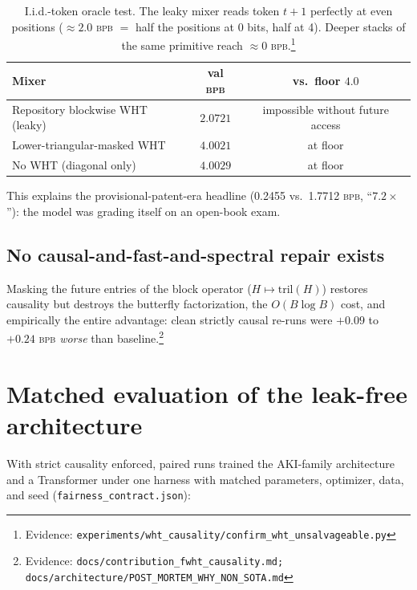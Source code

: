 \documentclass[11pt]{article}
\newcommand{\bpb}{\textsc{bpb}}
\newcommand{\evid}[1]{\footnote{Evidence: \texttt{#1}}}
\begin{document}
\begin{table}[h]
\centering
\begin{tabular}{lcc}
\toprule
Mixer & val \bpb & vs.\ floor $4.0$\\
\midrule
Repository blockwise WHT (leaky) & $\mathbf{2.0721}$ & impossible without future access\\
Lower-triangular-masked WHT & $4.0021$ & at floor\\
No WHT (diagonal only) & $4.0029$ & at floor\\
\bottomrule
\end{tabular}
\caption{I.i.d.-token oracle test. The leaky mixer reads token $t{+}1$
perfectly at even positions ($\approx 2.0$ \bpb{} $=$ half the positions at 0
bits, half at 4). Deeper stacks of the same primitive reach $\approx 0$
\bpb.\protect\evid{experiments/wht\_causality/confirm\_wht\_unsalvageable.py}}
\label{tab:oracle}
\end{table}

This explains the provisional-patent-era headline (0.2455 vs.\ 1.7712 \bpb,
``$7.2\times$''): the model was grading itself on an open-book exam.

\subsection{No causal-and-fast-and-spectral repair exists}
Masking the future entries of the block operator ($H \mapsto
\mathrm{tril}(H)$) restores causality but destroys the butterfly
factorization, the $O(B\log B)$ cost, and empirically the entire advantage:
clean strictly causal re-runs were $+0.09$ to $+0.24$ \bpb{} \emph{worse} than
baseline.\evid{docs/contribution\_fwht\_causality.md;
docs/architecture/POST\_MORTEM\_WHY\_NON\_SOTA.md}

\section{Matched evaluation of the leak-free architecture}
\label{sec:matched}
With strict causality enforced, paired runs trained the AKI-family architecture
and a Transformer under one harness with matched parameters, optimizer, data,
and seed (\texttt{fairness\_contract.json}):
\end{document}
